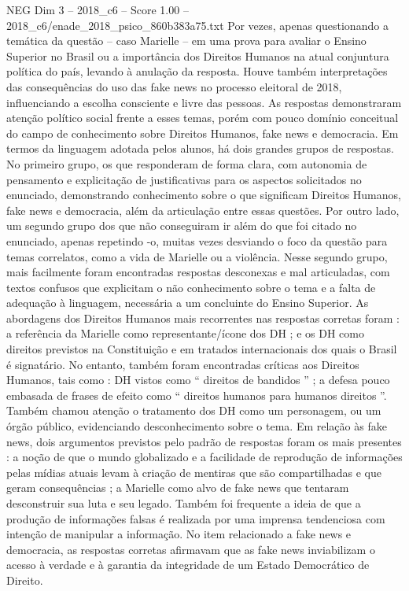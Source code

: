 \begin{textsample}{NEG Dim 3 – 2018\_c6 – Score 1.00 – 2018\_c6/enade\_2018\_psico\_860b383a75.txt}
Por vezes, apenas questionando a temática da questão – caso Marielle – em uma prova para avaliar o Ensino Superior no Brasil ou a importância dos Direitos Humanos na atual conjuntura política do país, levando à anulação da resposta.
Houve também interpretações das consequências do uso das fake news no processo eleitoral de 2018, influenciando a escolha consciente e livre das pessoas.
As respostas demonstraram atenção político social frente a esses temas, porém com pouco domínio conceitual do campo de conhecimento sobre Direitos Humanos, fake news e democracia.
Em termos da linguagem adotada pelos alunos, há dois grandes grupos de respostas.
No primeiro grupo, os que responderam de forma clara, com autonomia de pensamento e explicitação de justificativas para os aspectos solicitados no enunciado, demonstrando conhecimento sobre o que significam Direitos Humanos, fake news e democracia, além da articulação entre essas questões.
Por outro lado, um segundo grupo dos que não conseguiram ir além do que foi citado no enunciado, apenas repetindo -o, muitas vezes desviando o foco da questão para temas correlatos, como a vida de Marielle ou a violência.
Nesse segundo grupo, mais facilmente foram encontradas respostas desconexas e mal articuladas, com textos confusos que explicitam o não conhecimento sobre o tema e a falta de adequação à linguagem, necessária a um concluinte do Ensino Superior.
As abordagens dos Direitos Humanos mais recorrentes nas respostas corretas foram : a referência da Marielle como representante/ícone dos DH ; e os DH como direitos previstos na Constituição e em tratados internacionais dos quais o Brasil é signatário.
No entanto, também foram encontradas críticas aos Direitos Humanos, tais como : DH vistos como “ direitos de bandidos ” ; a defesa pouco embasada de frases de efeito como “ direitos humanos para humanos direitos ”.
Também chamou atenção o tratamento dos DH como um personagem, ou um órgão público, evidenciando desconhecimento sobre o tema.
Em relação às fake news, dois argumentos previstos pelo padrão de respostas foram os mais presentes : a noção de que o mundo globalizado e a facilidade de reprodução de informações pelas mídias atuais levam à criação de mentiras que são compartilhadas e que geram consequências ; a Marielle como alvo de fake news que tentaram desconstruir sua luta e seu legado.
Também foi frequente a ideia de que a produção de informações falsas é realizada por uma imprensa tendenciosa com intenção de manipular a informação.
No item relacionado a fake news e democracia, as respostas corretas afirmavam que as fake news inviabilizam o acesso à verdade e à garantia da integridade de um Estado Democrático de Direito.

\end{textsample}
